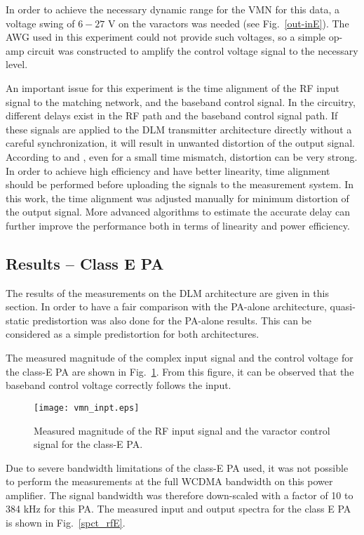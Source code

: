 \documentclass[10pt,journal]{IEEEtran}
\begin{document}
In order to achieve the necessary dynamic range for the VMN for this data, a
voltage swing of $6 - 27$ V on the varactors was needed (see Fig.~\ref{out-inE}). The AWG
used in this experiment could not provide such voltages, so a  simple
op-amp circuit was constructed to amplify the control voltage signal
to the necessary level.

An important issue for this experiment is the time alignment of the RF input signal to the matching network, and the baseband control signal. In the circuitry, different delays exist in the RF path and the baseband control signal path. If these signals are applied to the DLM transmitter architecture directly without a careful synchronization, it will result in unwanted distortion of the output signal. According to \cite{raab1} and \cite{rudolph}, even for a small time mismatch, distortion can be very strong. In order to achieve high efficiency and have better linearity, time alignment should be performed before uploading the signals to the measurement system. In this work, the time alignment was adjusted manually for minimum distortion of the output signal. More advanced algorithms to estimate the accurate delay can further improve the performance both in terms of linearity and power efficiency.

\subsection{Results -- Class E PA}
The results of the measurements on the DLM architecture are given in this section. In order to have a fair comparison with the PA-alone architecture, quasi-static predistortion was also done for the PA-alone results. This can be considered as a simple predistortion for both architectures.

The measured magnitude of the complex input signal and the control voltage for the class-E PA are shown in Fig.~\ref{vc_inpt}. From this figure, it can be observed that the baseband control voltage correctly follows the input.

\begin{figure}
\centering
\texttt{[image: vmn\_inpt.eps]}
\caption{Measured magnitude of the RF input signal and the varactor control
signal for the class-E PA.}
\label{vc_inpt}
\end{figure}

Due to severe bandwidth limitations of the class-E PA used, it was not possible to perform the measurements at the full WCDMA bandwidth on this power amplifier. The signal bandwidth was therefore down-scaled with a factor of 10 to 384 kHz for this PA. The measured input and output spectra for the class E PA is shown in Fig.~\ref{spct_rfE}.
\end{document}
